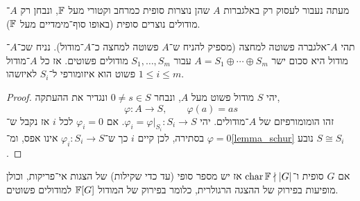 מעתה נעבור לעסוק רק באלגברות $A$ שהן נוצרות סופית כמרחב וקטורי מעל $\mathbb{F}$, ונבחן רק $A$־מודולים נוצרים סופית (באופו סוף־מימדיים מעל $\mathbb{F}$).
\begin{theorem}\label{theorem_semisimple_modules_equivalency}
	תהי $A$־אלגברה פשוטה למחצה (מספיק להניח ש־$A$ פשוטה למחצה כ־$A$־מודול).
	נניח שכ־$A$־מודול היא סכום ישר $A = S_1 \oplus \cdots \oplus S_m$ עבור $S_1, \ldots, S_m$ מודולים פשוטים.
	אז כל $A$־מודול פשוט הוא איזומורפי ל־$S_i$ לאיזשהו $1 \le i \le m$.
\end{theorem}
\begin{proof}
	יהי $S$ מודול פשוט מעל $A$, ונבחר $0 \ne s \in S$ ונגדיר את ההעתקה,
	\[
		\varphi : A \to S,
		\qquad
		\varphi(a) = a s
	\]
	זהו הומומורפיזם של $A$־מודולים.
	יהי $\varphi_i = \varphi |_{S_i} : S_i \to S$. אם $\varphi_i = 0$ לכל $i$ אז נקבל ש־$\varphi = 0$ בסתירה, לכן קיים $i$ כך ש־$\varphi_i : S_i \to S$ אינו אפס, ומ־\ref{lemma_schur} נובע $S \cong S_i$.
\end{proof}
\begin{corollary}
	אם $G$ סופית ו־$\operatorname{char} \mathbb{F} \nmid |G|$ אז יש מספר סופי (עד כדי שקילות) של הצגות אי־פריקות, וכולן מופיעות בפירוק של ההצגה הרגולרית, כלומר בפירוק של המודול $\mathbb{F}[G]$ למודולים פשוטים.
\end{corollary}


